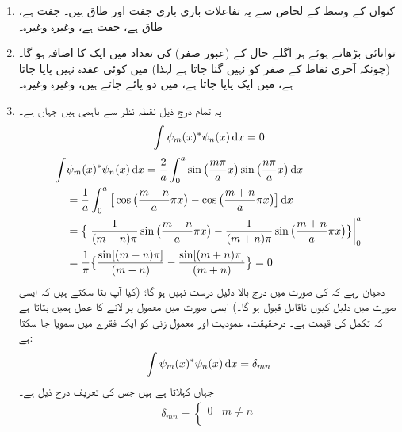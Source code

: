 \begin{enumerate}
\item
 کنواں کے وسط کے لحاض سے یہ تفاعلات باری باری جفت اور طاق ہیں۔       جفت ہے،       طاق ہے،   جفت ہے، وغیرہ وغیرہ۔
\item
توانائی بڑھاتے ہوئے ہر اگلے حال کے  (عبور صفر) کی تعداد میں ایک  کا اضافہ ہو گا۔  (چونکہ آخری نقاط کے صفر کو نہیں گنا جاتا ہے لہٰذا)  میں کوئی عقدہ نہیں پایا جاتا ہے،    میں ایک پایا جاتا ہے،  میں دو پائے جاتے ہیں، وغیرہ وغیرہ۔
\item
 یہ تمام درج ذیل نقطہ نظر سے باہمی  ہیں جہاں  
 ہے۔
\begin{align}
\int\psi_{m}(x)^*\psi_{n}(x)\dif{x}=0
\end{align}
\quad
\begin{align*}
\int&\psi_{m}(x)^*\psi_{n}(x)\dif{x}=\frac{2}{a}\int_{0}^{a}\sin\big(\frac{m\pi}{a}x\big)\sin\big(\frac{n\pi}{a}x\big)\dif{x}\\
&=\frac{1}{a}\int_{0}^{a}\big[\cos\big(\frac{m-n}{a}\pi x\big)-\cos\big(\frac{m+n}{a}\pi x\big)\big]\dif{x}\\
&=\big\{\left.\frac{1}{(m-n)\pi}\sin\big(\frac{m-n}{a}\pi x\big)-\frac{1}{(m+n)\pi}\sin\big(\frac{m+n}{a}\pi x\big)\big\}\right\vert_{0}^{a}\\
&=\frac{1}{\pi}\big\{\frac{\sin[(m-n)\pi]}{(m-n)}-\frac{\sin[(m+n)\pi]}{(m+n)}\big\}=0
\end{align*} 
دھیان رہے کہ     کی صورت میں درج بالا دلیل درست نہیں ہو گا؛ (کیا آپ بتا سکتے ہیں کہ ایسی صورت میں دلیل کیوں ناقابل قبول ہو گا۔) ایسی صورت میں معمول پر لانے کا عمل ہمیں بتاتا ہے کہ تکمل کی قیمت   ہے۔ درحقیقت، عمودیت اور معمول زنی کو ایک فقرے میں سمویا جا  سکتا ہے:
\begin{align}
\int\psi_{m}(x)^*\psi_{n}(x)\dif{x}=\delta_{mn}
\end{align}
جہاں      کہلاتا ہے ہیں جس کی تعریف درج ذیل ہے۔ 
\begin{align}
\delta_{mn}=
\begin{cases}
0&  m\neq n\\

\end{cases}
\end{align}
\end{enumerate}

